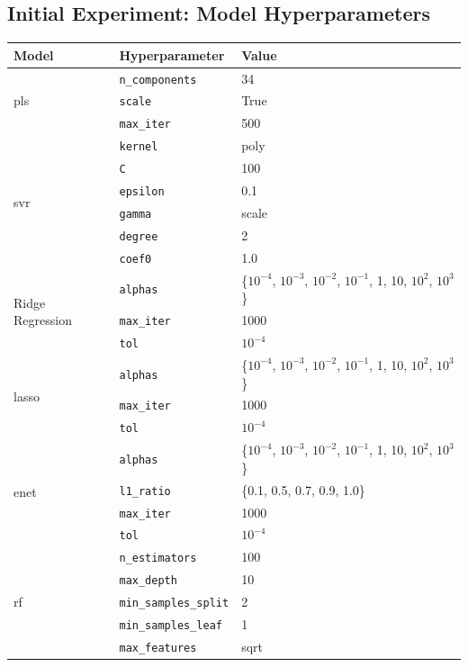 \subsection{Initial Experiment: Model Hyperparameters}\label{subsec:initial_experiment_hyperparameters}
\begin{table}[h]
\centering
\begin{tabular}{@{}llp{}@{}}
\toprule
\textbf{Model} & \textbf{Hyperparameter} & \textbf{Value} \\
\midrule
\multirow{3}{*}{\gls{pls}}
& \texttt{n\_components} & 34 \\
& \texttt{scale} & True \\
& \texttt{max\_iter} & 500 \\
\midrule
\multirow{6}{*}{\gls{svr}}
& \texttt{kernel} & poly \\
& \texttt{C} & 100 \\
& \texttt{epsilon} & 0.1 \\
& \texttt{gamma} & scale \\
& \texttt{degree} & 2 \\
& \texttt{coef0} & 1.0 \\
\midrule
\multirow{3}{*}{Ridge Regression}
& \texttt{alphas} & \{$10^{-4}$, $10^{-3}$, $10^{-2}$, $10^{-1}$, 1, 10, $10^2$, $10^3$\} \\
& \texttt{max\_iter} & 1000 \\
& \texttt{tol} & $10^{-4}$ \\
\midrule
\multirow{3}{*}{\gls{lasso}}
& \texttt{alphas} & \{$10^{-4}$, $10^{-3}$, $10^{-2}$, $10^{-1}$, 1, 10, $10^2$, $10^3$\} \\
& \texttt{max\_iter} & 1000 \\
& \texttt{tol} & $10^{-4}$ \\
\midrule
\multirow{4}{*}{\gls{enet}}
& \texttt{alphas} & \{$10^{-4}$, $10^{-3}$, $10^{-2}$, $10^{-1}$, 1, 10, $10^2$, $10^3$\} \\
& \texttt{l1\_ratio} & \{0.1, 0.5, 0.7, 0.9, 1.0\} \\
& \texttt{max\_iter} & 1000 \\
& \texttt{tol} & $10^{-4}$ \\
\midrule
\multirow{6}{*}{\gls{rf}}
& \texttt{n\_estimators} & 100 \\
& \texttt{max\_depth} & 10 \\
& \texttt{min\_samples\_split} & 2 \\
& \texttt{min\_samples\_leaf} & 1 \\
& \texttt{max\_features} & sqrt \\

\end{tabular}
\end{table}
